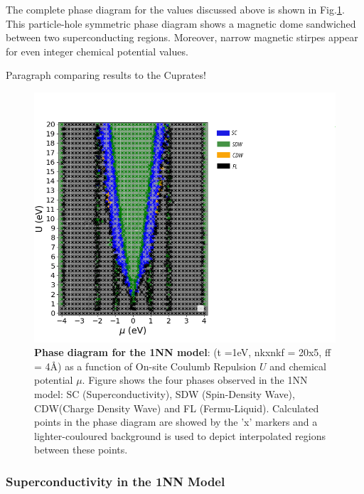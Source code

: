 \documentclass[12pt]{article}
\begin{document}
\medskip
\noindent The complete phase diagram for the values discussed above is shown in Fig.\ref{fig:1NNpd}. This particle-hole symmetric phase diagram shows a magnetic dome sandwiched between two superconducting regions. Moreover, narrow magnetic stirpes appear for even
integer chemical potential values.
\par

\medskip

\noindent Paragraph comparing results to the Cuprates!





\begin{figure}[htbp]  %
    \centering
    \includegraphics[width=1.25\textwidth]{1NNphasediagram.png}  %
    \caption{\textbf{Phase diagram for the 1NN model}:  (t =1eV, nkxnkf = 20x5, ff = 4\AA) as a function of On-site Coulumb Repulsion $U$ and chemical potential $\mu$. 
    Figure shows the four phases observed in the 1NN model: SC (Superconductivity), SDW (Spin-Density Wave), CDW(Charge Density Wave) and FL (Fermu-Liquid).
    Calculated points in the phase diagram are showed by the 'x' markers and a lighter-couloured background is used to depict interpolated regions between these points. }
    \label{fig:1NNpd}
\end{figure}

\newpage


\subsubsection{Superconductivity in the 1NN Model}
\end{document}
